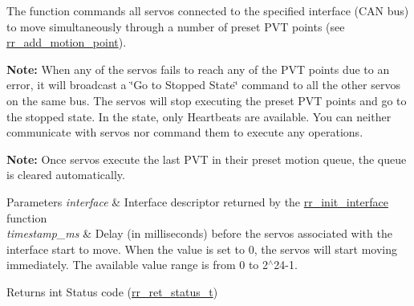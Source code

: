 The function commands all servos connected to the specified interface (C\+AN bus) to move simultaneously through a number of preset P\+VT points (see \hyperlink{group___trajectory_gaba5ac04eeadd4a8d888b409f34837ece}{rr\+\_\+add\+\_\+motion\+\_\+point}).~\newline
 

{\bfseries Note\+:} When any of the servos fails to reach any of the P\+VT points due to an error, it will broadcast a \char`\"{}\+Go to Stopped State\char`\"{} command to all the other servos on the same bus. The servos will stop executing the preset P\+VT points and go to the stopped state. In the state, only Heartbeats are available. You can neither communicate with servos nor command them to execute any operations.

{\bfseries Note\+:} Once servos execute the last P\+VT in their preset motion queue, the queue is cleared automatically.


\begin{DoxyParams}{Parameters}
{\em interface} & Interface descriptor returned by the \hyperlink{group___init_ga472a4890dcc7d7a13123c56a06946d91}{rr\+\_\+init\+\_\+interface} function \\
\hline
{\em timestamp\+\_\+ms} & Delay (in milliseconds) before the servos associated with the interface start to move. When the value is set to 0, the servos will start moving immediately. The available value range is from 0 to 2$^\wedge$24-\/1. \\
\hline
\end{DoxyParams}
\begin{DoxyReturn}{Returns}
int Status code (\hyperlink{api_8h_a92d5be5038abcf89837faf85a08debdc}{rr\+\_\+ret\+\_\+status\+\_\+t}) 
\end{DoxyReturn}
